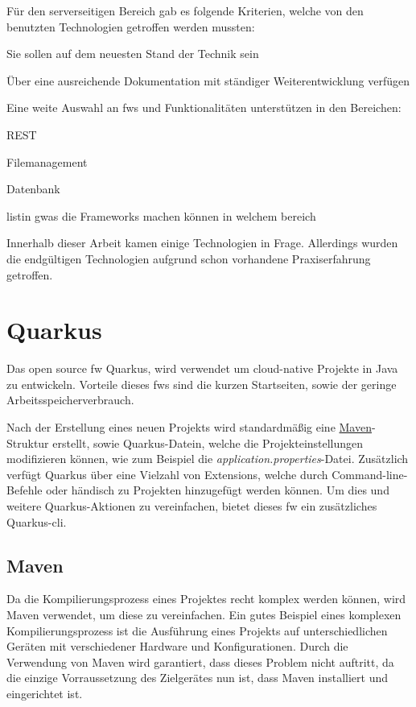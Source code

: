 Für den serverseitigen Bereich gab es folgende Kriterien, welche von den benutzten Technologien getroffen werden mussten:
\begin{compactitem}
    \item Sie sollen auf dem neuesten Stand der Technik sein
    \item Über eine ausreichende Dokumentation mit ständiger Weiterentwicklung verfügen
    \item Eine weite Auswahl an \glspl{fw} und Funktionalitäten unterstützen in den Bereichen:
    \begin{compactitem}
        \item REST
        \item Filemanagement
        \item Datenbank
    \end{compactitem}
\end{compactitem} 
listin gwas die Frameworks machen können in welchem bereich

Innerhalb dieser Arbeit kamen einige Technologien in Frage. 
Allerdings wurden die endgültigen Technologien aufgrund schon vorhandene Praxiserfahrung getroffen. 

\section{Quarkus}
Das open source \gls{fw} Quarkus, wird verwendet um cloud-native Projekte in Java zu entwickeln. 
Vorteile dieses \glspl{fw} sind die kurzen Startseiten, sowie der geringe Arbeitsspeicherverbrauch.
\cite{QuarkusHomepage}

Nach der Erstellung eines neuen Projekts wird standardmäßig eine \hyperref[ch::MavenTool]{Maven}-Struktur erstellt, sowie Quarkus-Datein, welche die Projekteinstellungen modifizieren können, wie zum Beispiel die \emph{application.properties}-Datei. 
Zusätzlich verfügt Quarkus über eine Vielzahl von Extensions, welche durch Command-line-Befehle oder händisch zu Projekten hinzugefügt werden können. 
Um dies und weitere Quarkus-Aktionen zu vereinfachen, bietet dieses \gls{fw} ein zusätzliches Quarkus-\gls{cli}.
\cite{QuarkusAbout, QuarkusFirstApplication}


\subsection{Maven}
\label{ch::MavenTool}
Da die Kompilierungsprozess eines Projektes recht komplex werden können, wird Maven verwendet, um diese zu vereinfachen.
Ein gutes Beispiel eines komplexen Kompilierungsprozess ist die Ausführung eines Projekts auf unterschiedlichen Geräten mit verschiedener Hardware und Konfigurationen.
Durch die Verwendung von Maven wird garantiert, dass dieses Problem nicht auftritt, da die einzige Vorraussetzung des Zielgerätes nun ist, dass Maven installiert und eingerichtet ist.

